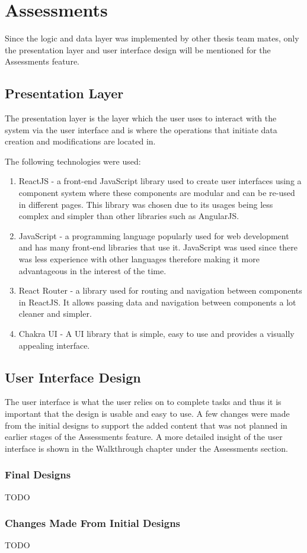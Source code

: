 \section {Assessments}
Since the logic and data layer was implemented by other thesis team mates, only the presentation layer and user interface design will be mentioned for the Assessments feature.

\subsection{Presentation Layer}
The presentation layer is the layer which the user uses to interact with the system via the user interface and is where the operations that initiate data creation and modifications are located in.

The following technologies were used:
\begin{enumerate}
	\item ReactJS - a front-end JavaScript library used to create user interfaces using a component system where these components are modular and can be re-used in different pages. This library was chosen due to its usages being less complex and simpler than other libraries such as AngularJS.
	\item JavaScript - a programming language popularly used for web development and has many front-end libraries that use it. JavaScript was used since there was less experience with other languages therefore making it more advantageous in the interest of the time.
	\item React Router - a library used for routing and navigation between components in ReactJS. It allows passing data and navigation between components a lot cleaner and simpler.
	\item Chakra UI - A UI library that is simple, easy to use and provides a visually appealing interface. 
\end{enumerate}

\subsection{User Interface Design}
The user interface is what the user relies on to complete tasks and thus it is important that the design is usable and easy to use. A few changes were made from the initial designs to support the added content that was not planned in earlier stages of the Assessments feature. A more detailed insight of the user interface is shown in the Walkthrough chapter under the Assessments section. 

\subsubsection{Final Designs}
TODO

\subsubsection{Changes Made From Initial Designs}
TODO